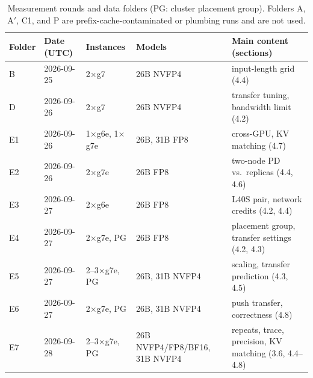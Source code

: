\documentclass[11pt]{article}
\begin{document}
\begin{table}[H]
\centering\small
\footnotesize
\begin{tabularx}{\linewidth}{llp{2.6cm}p{2.9cm}X}
\toprule
Folder & Date (UTC) & Instances & Models & Main content (sections) \\
\midrule
B  & 2026-09-25 & 2$\times$g7 & 26B NVFP4 & input-length grid (4.4) \\
D  & 2026-09-26 & 2$\times$g7 & 26B NVFP4 & transfer tuning, bandwidth limit (4.2) \\
E1 & 2026-09-26 & 1$\times$g6e, 1$\times$g7e & 26B, 31B FP8 & cross-GPU, KV matching (4.7) \\
E2 & 2026-09-26 & 2$\times$g7e & 26B FP8 & two-node PD vs.\ replicas (4.4, 4.6) \\
E3 & 2026-09-27 & 2$\times$g6e & 26B FP8 & L40S pair, network credits (4.2, 4.4) \\
E4 & 2026-09-27 & 2$\times$g7e, PG & 26B FP8 & placement group, transfer settings (4.2, 4.3) \\
E5 & 2026-09-27 & 2--3$\times$g7e, PG & 26B, 31B NVFP4 & scaling, transfer prediction (4.3, 4.5) \\
E6 & 2026-09-27 & 2$\times$g7e, PG & 26B, 31B NVFP4 & push transfer, correctness (4.8) \\
E7 & 2026-09-28 & 2--3$\times$g7e, PG & 26B NVFP4/FP8/BF16, 31B NVFP4 & repeats, trace, precision, KV matching (3.6, 4.4--4.8) \\
\bottomrule
\end{tabularx}
\caption{Measurement rounds and data folders (PG: cluster placement group). Folders A, A$'$, C1, and P are prefix-cache-contaminated or plumbing runs and are not used.}
\label{tab:folders}
\end{table}
\end{document}
